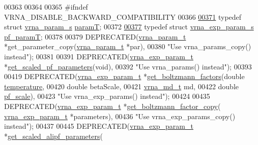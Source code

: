 \begin{DoxyCode}
00363 
00364 
00365 \textcolor{preprocessor}{#ifndef VRNA\_DISABLE\_BACKWARD\_COMPATIBILITY}
00366 
\hyperlink{group__energy__parameters_ga857dde86357d306cc902f0d8b2797659}{00371} \textcolor{keyword}{typedef} \textcolor{keyword}{struct }\hyperlink{group__energy__parameters_structvrna__param__s}{vrna\_param\_s} \hyperlink{group__energy__parameters_structvrna__param__s}{paramT};
00372 
\hyperlink{group__energy__parameters_ga8bffe1828e2cbec101769f5cc0b1535b}{00377} \textcolor{keyword}{typedef} \textcolor{keyword}{struct }\hyperlink{group__energy__parameters_structvrna__exp__param__s}{vrna\_exp\_param\_s} \hyperlink{group__energy__parameters_structvrna__exp__param__s}{pf\_paramT};
00378 
00379 DEPRECATED(\hyperlink{group__energy__parameters_structvrna__param__s}{vrna\_param\_t} *get\_parameter\_copy(\hyperlink{group__energy__parameters_structvrna__param__s}{vrna\_param\_t} *par),
00380 \textcolor{stringliteral}{"Use vrna\_params\_copy() instead"});
00381 
00391 DEPRECATED(\hyperlink{group__energy__parameters_structvrna__exp__param__s}{vrna\_exp\_param\_t} *\hyperlink{group__energy__parameters_gabf3b9271c41dd3fac02d56e0b02b3344}{get\_scaled\_pf\_parameters}(\textcolor{keywordtype}{void}),
00392 \textcolor{stringliteral}{"Use vrna\_params() instead"});
00393 
00419 DEPRECATED(\hyperlink{group__energy__parameters_structvrna__exp__param__s}{vrna\_exp\_param\_t} *\hyperlink{group__energy__parameters_gaef2b931c7e9d4ffb0a5c33df50ec2068}{get\_boltzmann\_factors}(\textcolor{keywordtype}{double}     
      \hyperlink{group__energy__parameters_aeed2cd83713012bcb52e431041e037c8}{temperature},
00420                                                    \textcolor{keywordtype}{double}     betaScale,
00421                                                    \hyperlink{group__model__details_structvrna__md__s}{vrna\_md\_t}  md,
00422                                                    \textcolor{keywordtype}{double}     \hyperlink{group__model__details_gad3b22044065acc6dee0af68931b52cfd}{pf\_scale}),
00423 \textcolor{stringliteral}{"Use vrna\_exp\_params() instead"});
00424 
00435 DEPRECATED(\hyperlink{group__energy__parameters_structvrna__exp__param__s}{vrna\_exp\_param\_t} *\hyperlink{group__energy__parameters_ga665a446ba8ff211e551297a8fa36ec27}{get\_boltzmann\_factor\_copy}(
      \hyperlink{group__energy__parameters_structvrna__exp__param__s}{vrna\_exp\_param\_t} *parameters),
00436 \textcolor{stringliteral}{"Use vrna\_exp\_params\_copy() instead"});
00437 
00445 DEPRECATED(\hyperlink{group__energy__parameters_structvrna__exp__param__s}{vrna\_exp\_param\_t} *\hyperlink{group__energy__parameters_ga0ccf4e1be085a573533fd6b9da2d8cf9}{get\_scaled\_alipf\_parameters}(\textcolor{keywordtype}{
}
\end{DoxyCode}
